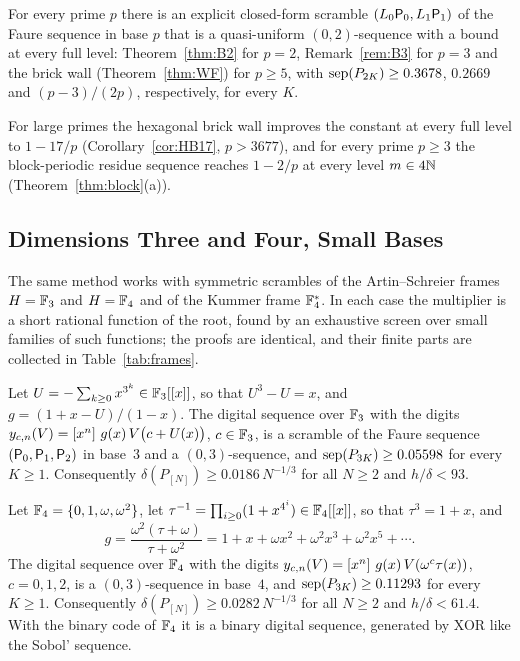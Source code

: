 \begin{corollary}\label{cor:allprimes}
For every prime $p$ there is an explicit closed-form scramble $(L_0\mathsf{P}_0,L_1\mathsf{P}_1)$ of the Faure sequence in base $p$ that is a quasi-uniform $(0,2)$-sequence with a bound at every full level: Theorem~\ref{thm:B2} for $p=2$, Remark~\ref{rem:B3} for $p=3$ and the brick wall (Theorem~\ref{thm:WF}) for $p\ge5$, with $\operatorname{sep}(P_{2K})\ge0.3678$, $0.2669$ and $(p-3)/(2p)$, respectively, for every $K$.
\end{corollary}

For large primes the hexagonal brick wall improves the constant at every full level to $1-17/p$ (Corollary~\ref{cor:HB17}, $p>3677$), and for every prime $p\ge3$ the block-periodic residue sequence reaches $1-2/p$ at every level $m\in4\mathbb{N}$ (Theorem~\ref{thm:block}(a)).

\subsection{Dimensions Three and Four, Small Bases}\label{sec:smallthree}
The same method works with symmetric scrambles of the Artin--Schreier frames $H=\mathbb{F}_3$ and $H=\mathbb{F}_4$ and of the Kummer frame $\mathbb{F}_4^*$. In each case the multiplier is a short rational function of the root, found by an exhaustive screen over small families of such functions; the proofs are identical, and their finite parts are collected in Table~\ref{tab:frames}.

\begin{theorem}\label{thm:S3}
Let $U=-\sum_{k\ge0}x^{3^k}\in\mathbb{F}_3[[x]]$, so that $U^3-U=x$, and $g=(1+x-U)/(1-x)$. The digital sequence over $\mathbb{F}_3$ with the digits $y_{c,n}(V)=[x^{n}]\,\,g(x)\,V\bigl(c+U(x)\bigr)$, $c\in\mathbb{F}_3$, is a scramble of the Faure sequence $(\mathsf{P}_0,\mathsf{P}_1,\mathsf{P}_2)$ in base~$3$ and a $(0,3)$-sequence, and $\operatorname{sep}(P_{3K})\ge0.05598$ for every $K\ge1$. Consequently $\delta(P_{[N]})\ge0.0186\,N^{-1/3}$ for all $N\ge2$ and $h/\delta<93$.
\end{theorem}

\begin{theorem}\label{thm:K4}
Let $\mathbb{F}_4=\{0,1,\omega,\omega^2\}$, let $\tau^{-1}=\prod_{i\ge0}(1+x^{4^i})\in\mathbb{F}_4[[x]]$, so that $\tau^3=1+x$, and
\[
g=\frac{\omega^2(\tau+\omega)}{\tau+\omega^2}=1+x+\omega x^2+\omega^2x^3+\omega^2x^5+\cdots.
\]
The digital sequence over $\mathbb{F}_4$ with the digits $y_{c,n}(V)=[x^{n}]\,\,g(x)\,V(\omega^c\tau(x))$, $c=0,1,2$, is a $(0,3)$-sequence in base~$4$, and $\operatorname{sep}(P_{3K})\ge0.11293$ for every $K\ge1$. Consequently $\delta(P_{[N]})\ge0.0282\,N^{-1/3}$ for all $N\ge2$ and $h/\delta<61.4$. With the binary code of $\mathbb{F}_4$ it is a binary digital sequence, generated by XOR like the Sobol' sequence.
\end{theorem}

